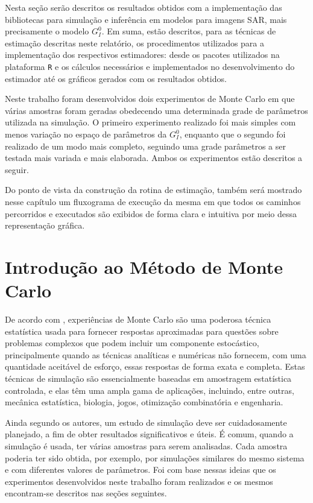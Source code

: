 
Nesta seção serão descritos os resultados obtidos com a implementação das bibliotecas para simulação e inferência em modelos para imagens SAR, mais precisamente o modelo $G_I^0$. Em suma, estão descritos, para as técnicas de estimação descritas neste relatório, os procedimentos utilizados para a implementação dos respectivos estimadores: desde os pacotes utilizados na plataforma \texttt{R} e os cálculos necessários e implementados no desenvolvimento do estimador até os gráficos gerados com os resultados obtidos.

Neste trabalho foram desenvolvidos dois experimentos de Monte Carlo em que várias amostras foram geradas obedecendo uma determinada grade de parâmetros utilizada na simulação. O primeiro experimento realizado foi mais simples com menos variação no espaço de parâmetros da $G_I^0$, enquanto que o segundo foi realizado de um modo mais completo, seguindo uma grade parâmetros a ser testada mais variada e mais elaborada. Ambos os experimentos estão descritos a seguir.

Do ponto de vista da construção da rotina de estimação, também será mostrado nesse capítulo um fluxograma de execução da mesma em que todos os caminhos percorridos e executados são exibidos de forma clara e intuitiva por meio dessa representação gráfica.

\section{Introdução ao Método de Monte Carlo}

De acordo com \citet{busto92}, experiências de Monte Carlo são uma poderosa técnica estatística usada para fornecer respostas aproximadas para questões sobre problemas complexos que podem incluir um componente estocástico, principalmente quando as técnicas analíticas e numéricas não fornecem, com uma quantidade aceitável de esforço, essas respostas de forma exata e completa. Estas técnicas de simulação são essencialmente baseadas em amostragem estatística controlada, e elas têm uma ampla gama de aplicações, incluindo, entre outras, mecânica estatística, biologia, jogos, otimização combinatória e engenharia.

Ainda segundo os autores, um estudo de simulação deve ser cuidadosamente planejado, a fim de obter resultados significativos e úteis. É comum, quando a simulação é usada, ter várias amostras para serem analisadas. Cada amostra poderia ter sido obtida, por exemplo, por simulações similares do mesmo sistema e com diferentes valores de parâmetros. Foi com base nessas ideias que os experimentos desenvolvidos neste trabalho foram realizados e os mesmos encontram-se descritos nas seções seguintes.

